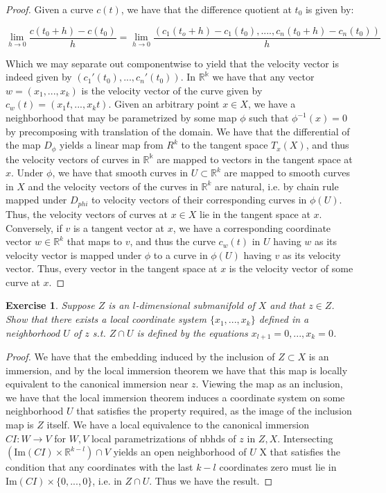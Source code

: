 \documentclass{article}
\newtheorem{exercise}{Exercise}
\begin{document}
      \begin{proof}
        Given a curve $c(t)$, we have that the difference quotient at $t_{0}$ is given by:

        \[
          \lim_{h \to 0} \frac{c(t_{0}+h) - c(t_{0})}{h} = \lim_{h \to 0} \frac{(c_{1}(t_{o}+h) - c_{1}(t_{0}), ...., c_{n}(t_{0}+h) - c_{n}(t_{0}))}{h}
        \]

        Which we may separate out componentwise to yield that the velocity vector is indeed given by $(c_{1}'(t_{0}),...,c_{n}'(t_{0}))$. In $\mathbb{R^{k}}$ we have that any vector $w=(x_{1},...,x_{k})$ is the velocity vector of the curve given by $c_{w}(t) = (x_{1}t,...,x_{k}t)$. Given an arbitrary point $x \in X$, we have a neighborhood that may be parametrized by some map $\phi$ such that $\phi^{-1}(x) = 0$ by precomposing with translation of the domain. We have that the differential of the map $D_{\phi}$ yields a linear map from $R^{k}$ to the tangent space $T_{x}(X)$, and thus the velocity vectors of curves in $\mathbb{R^{k}}$ are mapped to vectors in the tangent space at $x$. Under $\phi$, we have that smooth curves in $U \subset \mathbb{R}^{k}$ are mapped to smooth curves in $X$ and the velocity vectors of the curves in $\mathbb{R}^{k}$ are natural, i.e. by chain rule mapped under $D_{phi}$ to velocity vectors of their corresponding curves in $\phi(U)$. Thus, the velocity vectors of curves at $x \in X$ lie in the tangent space at $x$. Conversely, if $v$ is a tangent vector at $x$, we have a corresponding coordinate vector $w \in \mathbb{R}^{k}$ that maps to $v$, and thus the curve $c_{w}(t)$ in $U$ having $w$ as its velocity vector is mapped under $\phi$ to a curve in $\phi(U)$ having $v$ as its velocity vector. Thus, every vector in the tangent space at $x$ is the velocity vector of some curve at $x$.   
        \end{proof}

        \begin{exercise}
          Suppose $Z$ is an $l$-dimensional submanifold of $X$ and that $z \in Z$. Show that there exists a local coordinate system $\{x_{1},...,x_{k}\}$ defined in a neighborhood $U$ of $z$ s.t. $Z \cap U$ is defined by the equations $x_{l+1}=0,...,x_{k} = 0$.
        \end{exercise}

        \begin{proof}
          We have that the embedding induced by the inclusion of $Z \subset X$ is an immersion, and by the local immersion theorem we have that this map is locally equivalent to the canonical immersion near $z$. Viewing the map as an inclusion, we have that the local immersion theorem induces a coordinate system on some neighborhood $U$ that satisfies the property required, as the image of the inclusion map is $Z$ itself. We have a local equivalence to the canonical immersion $CI: W \to V$ for $W, V$ local parametrizations of nbhds of $z$ in $Z,X$. Intersecting $(\text{Im}(CI)\times \mathbb{R}^{k-l}) \cap V$ yields an open neighborhood of $U$ X that satisfies the condition that any coordinates with the last $k-l$ coordinates zero must lie in $\text{Im}(CI) \times \{0,...,0\}$, i.e. in $Z \cap U$. Thus we have the result. 
        \end{proof}
\end{document}
